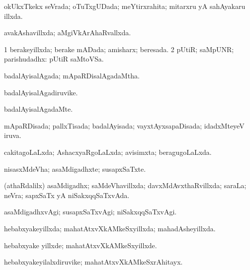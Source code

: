 {\bentry
{} 
\gl{\gu}
\expl{}
\bmng
okUkxTkekx seVrada; oTuTxgUDada; meYtirxrahita; mitarxru yA sahAyakaru illxda. 
\emng
\eentry

\bentry
{} 
\gl{\gu}
\expl{}
\bmng
avakAshavillxda; aMgiVkArAhaRvallxda. 
\emng
\eentry

\bentry
{} 
\gl{\gu}
\expl{}
\bmng
\bnum
\num{1} berakeyillxda; berake mADada; amisharx; beresada. 
\num{2} pUtiR; saMpUNR; parishudadhx:  pUtiR saMtoVSa. 
\enum
\emng
\eentry

\bentry
{} 
\gl{\gu}
\expl{}
\bmng
badalAyisalAgada; mApaRDisalAgadaMtha. 
\emng
\eentry

\bentry
{} 
\gl{\nA}
\expl{}
\bmng
badalAyisalAgadiruvike. 
\emng
\eentry

\bentry
{} 
\gl{\kirxvi}
\expl{}
\bmng
badalAyisalAgadaMte. 
\emng
\eentry

\bentry
{} 
\gl{\gu}
\expl{}
\bmng
mApaRDisada; pallxTisada; badalAyisada; vayxtAyxsapaDisada; idadxMteyeV iruva. 
\emng
\eentry

\bentry
{} 
\gl{\gu}
\expl{}
\bmng
cakitagoLaLxda; AshacxyaRgoLaLxda; avisimxta; beragugoLaLxda. 
\emng
\eentry

\bentry
{} 
\gl{\nA}
\expl{}
\bmng
nisasxMdeVha; asaMdigadhxte; susapxSaTxte. 
\emng
\eentry

\bentry
{} 
\gl{\gu}
\expl{}
\bmng
(athaRdalilx) asaMdigadhx; saMdeVhavillxda; davxMdAvxthaRvillxda; saraLa; neVra; sapxSaTx yA niSakxqqSaTxvAda. 
\emng
\eentry

\bentry
{} 
\gl{\kirxvi}
\expl{}
\bmng
asaMdigadhxvAgi; susapxSaTxvAgi; niSakxqqSaTxvAgi. 
\emng
\eentry

\bentry
{} 
\gl{\gu}
\expl{}
\bmng
hebabxyakeyillxda; mahatAtxvXkAMkeSxyillxda; mahadAsheyillxda. 
\emng
\eentry

\bentry
{} 
\gl{\kirxvi}
\expl{}
\bmng
hebabxyake yillxde; mahatAtxvXkAMkeSxyillxde. 
\emng
\eentry

\bentry
{} 
\gl{\nA}
\expl{}
\bmng
hebabxyakeyilalxdiruvike; mahatAtxvXkAMkeSxrAhitayx. 
\emng
\eentry

}
